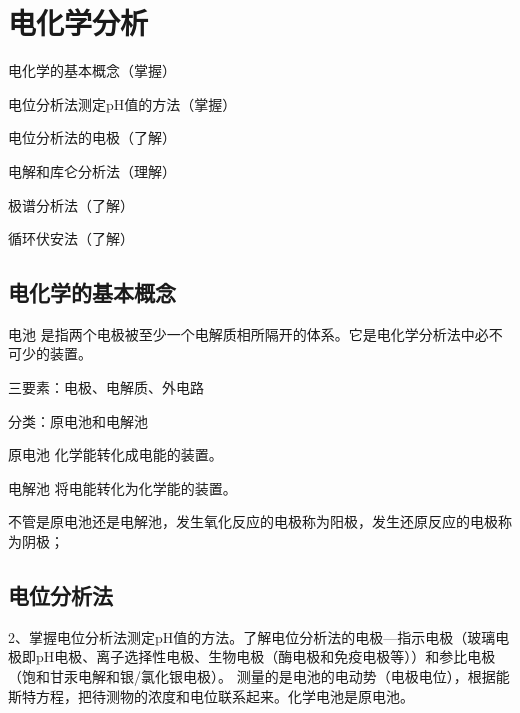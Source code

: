 \chapter{电化学分析}

\begin{introduction}
	\item 电化学的基本概念（掌握）
	\item 电位分析法测定pH值的方法（掌握）
	\item 电位分析法的电极（了解）
	\item 电解和库仑分析法（理解）
	\item 极谱分析法（了解）
	\item 循环伏安法（了解）
\end{introduction}



\section{电化学的基本概念}

\begin{definition*}{电池}{}
	是指两个电极被至少一个电解质相所隔开的体系。它是电化学分析法中必不可少的装置。
	
	三要素：电极、电解质、外电路
	
	分类：原电池和电解池
\end{definition*}


\begin{definition*}{原电池}{}
	化学能转化成电能的装置。
	

\end{definition*}

\begin{definition*}{电解池}{}
	将电能转化为化学能的装置。
\end{definition*}

不管是原电池还是电解池，发生氧化反应的电极称为阳极，发生还原反应的电极称为阴极；%


\section{电位分析法}
2、掌握电位分析法测定pH值的方法。了解电位分析法的电极—指示电极（玻璃电极即pH电极、离子选择性电极、生物电极（酶电极和免疫电极等））和参比电极（饱和甘汞电解和银/氯化银电极）。
测量的是电池的电动势（电极电位），根据能斯特方程，把待测物的浓度和电位联系起来。化学电池是原电池。

